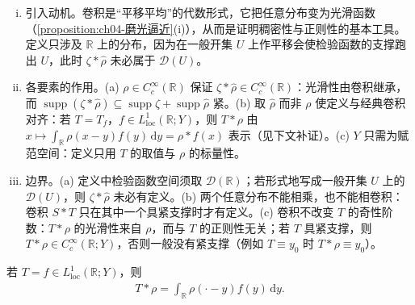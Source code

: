 \documentclass[../../main.tex]{subfiles}%
\begin{document}
\begin{remark}\label{remark:ch04-分布卷积动机}
\begin{enumerate}[(i)]
\item 引入动机。卷积是“平移平均”的代数形式，它把任意分布变为光滑函数（\cref{proposition:ch04-磨光逼近}(i)），从而是证明稠密性与正则性的基本工具。定义只涉及 $\mathbb{R}$ 上的分布，因为在一般开集 $U$ 上作平移会使检验函数的支撑跑出 $U$，此时 $\zeta*\hat\rho$ 未必属于 $\mathcal{D}(U)$。

\item 各要素的作用。(a) $\rho\in C_c^\infty(\mathbb{R})$ 保证 $\zeta*\hat\rho\in C_c^\infty(\mathbb{R})$：光滑性由卷积继承，而 $\operatorname{supp}(\zeta*\hat\rho)\subseteq\operatorname{supp}\zeta+\operatorname{supp}\hat\rho$ 紧。(b) 取 $\hat\rho$ 而非 $\rho$ 使定义与经典卷积对齐：若 $T=T_f$，$f\in L^1_{\mathrm{loc}}(\mathbb{R};Y)$，则 $T*\rho$ 由 $x\mapsto\int_{\mathbb{R}}\rho(x-y)f(y)\,\mathrm{d}y=\rho*f(x)$ 表示（见下文补证）。(c) $Y$ 只需为赋范空间：定义只用 $T$ 的取值与 $\rho$ 的标量性。

\item 边界。(a) 定义中检验函数空间须取 $\mathcal{D}(\mathbb{R})$；若形式地写成一般开集 $U$ 上的 $\mathcal{D}(U)$，则 $\zeta*\hat\rho$ 未必有定义。(b) 两个任意分布不能相乘，也不能相卷积：卷积 $S*T$ 只在其中一个具紧支撑时才有定义。(c) 卷积不改变 $T$ 的奇性阶数：$T*\rho$ 的光滑性来自 $\rho$，而与 $T$ 的正则性无关；若 $T$ 具紧支撑，则 $T*\rho\in C_c^\infty(\mathbb{R};Y)$，否则一般没有紧支撑（例如 $T\equiv y_0$ 时 $T*\rho\equiv y_0$）。
\end{enumerate}
\end{remark}

若 $T=f\in L^1_{\mathrm{loc}}(\mathbb{R};Y)$，则
\begin{align*}
T*\rho=\int_{\mathbb{R}}\rho(\cdot-y)f(y)\,\mathrm{d}y .
\end{align*}
\end{document}
